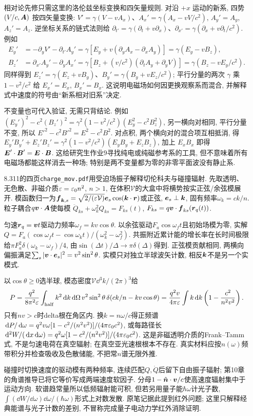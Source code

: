 相对论先修只需这里的洛伦兹坐标变换和四矢量规则. 对沿 $+x$ 运动的新系, 四势 $(V/c,\boldsymbol{A})$ 按四矢量变换:
$V'=\gamma(V-vA_x)$、$A_x'=\gamma(A_x-vV/c^2)$, $A_y'=A_y$, $A_z'=A_z$.
逆坐标关系的链式法则给 $\partial_{t'}=\gamma(\partial_t+v\partial_x)$、$\partial_{x'}=\gamma(\partial_x+v\partial_t/c^2)$. 例如
\begin{align*}
 E_y'&=-\partial_yV'-\partial_{t'}A_y'
 =\gamma[E_y+v(\partial_yA_x-\partial_xA_y)]
 =\gamma(E_y-vB_z),\\
 B_z'&=\partial_{x'}A_y'-\partial_yA_x'
 =\gamma[B_z+(v/c^2)(\partial_tA_y+\partial_yV)]
 =\gamma(B_z-vE_y/c^2).
\end{align*}
同样得到 $E_z'=\gamma(E_z+vB_y)$、$B_y'=\gamma(B_y+vE_z/c^2)$; 平行分量的两次 $\gamma$ 乘 $1-v^2/c^2$ 给 $E_x'=E_x$, $B_x'=B_x$. 这说明电磁场如何因更换观察系而混合, 并解释式中速度的符号由“新系相对旧系”决定.

不变量也可代入验证, 无需只背结论. 例如
$(E_y')^2-c^2(B_z')^2=\gamma^2(1-v^2/c^2)(E_y^2-c^2B_z^2)$,
另一横向对相同, 平行分量不变, 所以 $E'^2-c^2B'^2=E^2-c^2B^2$.
对点积, 两个横向对的混合项互相抵消, 得
$E_y'B_y'+E_z'B_z'=\gamma^2(1-v^2/c^2)(E_yB_y+E_zB_z)$,
加上 $E_xB_x$ 即得 $\boldsymbol{E}'\cdot\boldsymbol{B}'=\boldsymbol{E}\cdot\boldsymbol{B}$. 这给研究生作业9寻找纯电或纯磁参考系的工具, 但不意味着所有电磁场都能这样消去一种场; 特别是两不变量都为零的非零平面波没有静止系.

8.311的四页\texttt{charge\_mov.pdf}用受迫场振子解释切伦科夫与碰撞辐射. 先取透明、无色散、非磁介质$\varepsilon=\varepsilon_0 n^2$, $n>1$, 在体积$\mathcal V$的大盒中将横势按实正弦/余弦模展开. 模函数归一为$\boldsymbol{f}_{\boldsymbol{k},s}=\sqrt{2/(\varepsilon\mathcal V)}\boldsymbol{e}_s\cos(\boldsymbol{k}\cdot\boldsymbol{r})$或正弦, $\boldsymbol{e}_s\perp\boldsymbol{k}$, 固有频率$\omega_k=ck/n$. 粒子耦合$q\boldsymbol{v}\cdot\boldsymbol{A}$使每模
$\ddot Q_{ks}+\omega_k^2Q_{ks}=F_{ks}(t)$, $F_{ks}=q\boldsymbol{v}\cdot\boldsymbol{f}_{ks}(\boldsymbol{r}_q(t))$.

匀速$\boldsymbol{r}_q=\boldsymbol{v}t$驱动力频率$\omega_f=kv\cos\theta$. 以余弦驱动$F_a\cos\omega_ft$且初始场模为零, 实解$Q=F_a(\cos\omega_ft-\cos\omega_kt)/(\omega_k^2-\omega_f^2)$. 共振附近累计能的增长率在长时间极限给$\pi F_a^2\delta(\omega_k-\omega_f)/4$, 由$\sin(\Delta t)/\Delta\to\pi\delta(\Delta)$得到. 正弦模贡献相同, 两横向偏振满足$\sum_s|\boldsymbol{v}\cdot\boldsymbol{e}_s|^2=v^2\sin^2\theta$. 实模只对独立半球波矢计数, 相反$\boldsymbol{k}$不是另一个实模式.

以$\cos\theta\ge0$选半球, 模态密度$\mathcal V\dd^3k/(2\pi)^3$给
\[
P=\frac{q^2}{8\pi^2\varepsilon}\int_{\rm half}k^2\,\mathrm d k\,\mathrm d\Omega\,v^2\sin^2\theta\,\delta(ck/n-kv\cos\theta)
=\frac{q^2v}{4\pi\varepsilon}\int k\,\mathrm d k\left(1-\frac{c^2}{n^2v^2}\right).
\]
只有$nv>c$时delta根在角区内. 换$k=n\omega/c$得正频谱$\,\mathrm d P/\,\mathrm d\omega=q^2v\omega[1-c^2/(n^2v^2)]/(4\pi\varepsilon_0 c^2)$, 或每路径长$\,\mathrm d^2W/(\,\mathrm d x\,\mathrm d\omega)=q^2\omega[1-c^2/(n^2v^2)]/(4\pi\varepsilon_0 c^2)$. 这是非磁透明介质的Frank--Tamm式, 不是匀速电荷在真空辐射; 在真空亚光速根根本不存在. 真实材料应按$n(\omega)$频带积分并检查吸收及色散储能, 不把常$n$谱无限外推.

碰撞时切换速度的驱动模有两种频率, 连续匹配$Q,\dot Q$后留下自由振子辐射; 第10章的角谱推导已将它等价写成两端速度软因子. 分母$1-\hat{\boldsymbol{n}}\cdot\boldsymbol{v}/c$使高速度辐射集中于运动方向. 软谱趋常量所以低频辐射能可积, 但若另用量子能$\hbar\omega$计光子数, $\int(\dd W/\dd\omega)\dd\omega/(\hbar\omega)$形式上对数发散. 原笔记据此提到红外问题; 这里只解释经典能谱与光子计数的差别, 不冒称完成量子电动力学红外消除证明.
